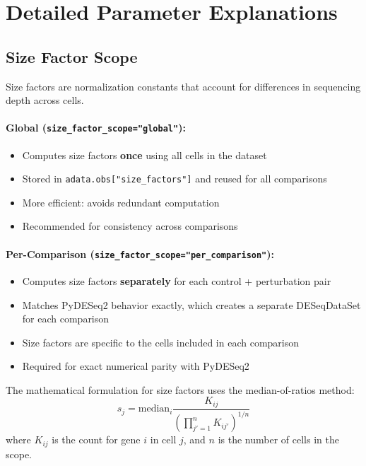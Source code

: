 \documentclass{article}
\begin{document}
\section{Detailed Parameter Explanations}

\subsection{Size Factor Scope}

Size factors are normalization constants that account for differences in sequencing depth across cells.

\paragraph{Global (\texttt{size\_factor\_scope="global"}):}
\begin{itemize}
    \item Computes size factors \textbf{once} using all cells in the dataset
    \item Stored in \texttt{adata.obs["size\_factors"]} and reused for all comparisons
    \item More efficient: avoids redundant computation
    \item Recommended for consistency across comparisons
\end{itemize}

\paragraph{Per-Comparison (\texttt{size\_factor\_scope="per\_comparison"}):}
\begin{itemize}
    \item Computes size factors \textbf{separately} for each control + perturbation pair
    \item Matches PyDESeq2 behavior exactly, which creates a separate DESeqDataSet for each comparison
    \item Size factors are specific to the cells included in each comparison
    \item Required for exact numerical parity with PyDESeq2
\end{itemize}

The mathematical formulation for size factors uses the median-of-ratios method:
\begin{equation}
    s_j = \text{median}_i \frac{K_{ij}}{\left(\prod_{j'=1}^{n} K_{ij'}\right)^{1/n}}
\end{equation}
where $K_{ij}$ is the count for gene $i$ in cell $j$, and $n$ is the number of cells in the scope.
\end{document}
